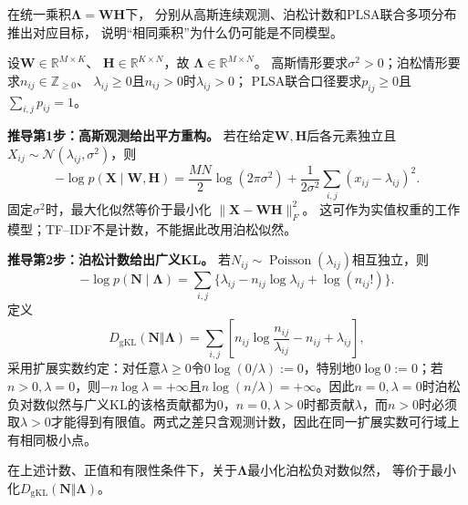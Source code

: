 \label{struct:V5-C08-CH11}

\begin{derivationgoalbox}
在统一乘积$\boldsymbol\Lambda=\boldsymbol W\boldsymbol H$下，
分别从高斯连续观测、泊松计数和PLSA联合多项分布推出对应目标，
说明“相同乘积”为什么仍可能是不同模型。
\end{derivationgoalbox}
\begin{derivationprepbox}
设$\boldsymbol W\in\mathbb R^{M\times K}$、
$\boldsymbol H\in\mathbb R^{K\times N}$，故
$\boldsymbol\Lambda\in\mathbb R^{M\times N}$。
高斯情形要求$\sigma^2>0$；泊松情形要求$n_{ij}\in\mathbb Z_{\ge0}$、
$\lambda_{ij}\ge0$且$n_{ij}>0$时$\lambda_{ij}>0$；
PLSA联合口径要求$p_{ij}\ge0$且$\sum_{i,j}p_{ij}=1$。
\end{derivationprepbox}

\textbf{推导第1步：高斯观测给出平方重构。}
若在给定$\boldsymbol W,\boldsymbol H$后各元素独立且
$X_{ij}\sim\mathcal N(\lambda_{ij},\sigma^2)$，则
\[
-\log p(\boldsymbol X\mid\boldsymbol W,\boldsymbol H)
=\frac{MN}{2}\log(2\pi\sigma^2)
+\frac{1}{2\sigma^2}\sum_{i,j}(x_{ij}-\lambda_{ij})^2.
\]
固定$\sigma^2$时，最大化似然等价于最小化
$\|\boldsymbol X-\boldsymbol W\boldsymbol H\|_F^2$。
这可作为实值权重的工作模型；TF--IDF不是计数，不能据此改用泊松似然。

\textbf{推导第2步：泊松计数给出广义KL。}
若$N_{ij}\sim\operatorname{Poisson}(\lambda_{ij})$相互独立，则
\[
-\log p(\boldsymbol N\mid\boldsymbol\Lambda)
=\sum_{i,j}\{\lambda_{ij}-n_{ij}\log\lambda_{ij}+\log(n_{ij}!)\}.
\]
定义
\[
D_{\mathrm{gKL}}(\boldsymbol N\Vert\boldsymbol\Lambda)
=\sum_{i,j}\left[
n_{ij}\log\frac{n_{ij}}{\lambda_{ij}}-n_{ij}+\lambda_{ij}\right],
\]
采用扩展实数约定：对任意$\lambda\ge0$令$0\log(0/\lambda):=0$，特别地$0\log0:=0$；若$n>0,\lambda=0$，则$-n\log\lambda=+\infty$且$n\log(n/\lambda)=+\infty$。因此$n=0,\lambda=0$时泊松负对数似然与广义KL的该格贡献都为$0$，$n=0,\lambda>0$时都贡献$\lambda$，而$n>0$时必须取$\lambda>0$才能得到有限值。两式之差只含观测计数，因此在同一扩展实数可行域上有相同极小点。

\label{struct:V5-C08-CH12}
\begin{proposition}[泊松负对数似然与广义KL等价]\label{prop:V5-C08-poisson-kl}
在上述计数、正值和有限性条件下，关于$\boldsymbol\Lambda$最小化泊松负对数似然，
等价于最小化$D_{\mathrm{gKL}}(\boldsymbol N\Vert\boldsymbol\Lambda)$。
\end{proposition}
\label{struct:V5-C08-CH13}
